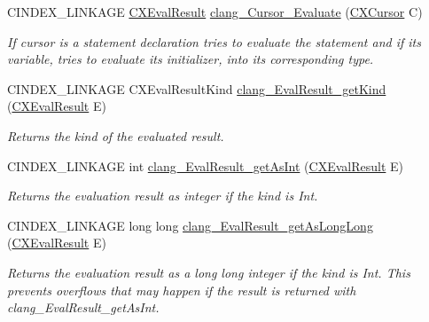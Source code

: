\begin{DoxyCompactItemize}
C\+I\+N\+D\+E\+X\+\_\+\+L\+I\+N\+K\+A\+GE \hyperlink{group__CINDEX__MISC_gaa9270afc68877e1f3b20ce5b343191bc}{C\+X\+Eval\+Result} \hyperlink{group__CINDEX__MISC_ga6be809ca82538f4a610d9a5b18a10ccb}{clang\+\_\+\+Cursor\+\_\+\+Evaluate} (\hyperlink{structCXCursor}{C\+X\+Cursor} C)
\begin{DoxyCompactList}\small\item\em If cursor is a statement declaration tries to evaluate the statement and if its variable, tries to evaluate its initializer, into its corresponding type. \end{DoxyCompactList}\item 
\mbox{\label{group__CINDEX__MISC_gaea912a0620a9c16c1e46fdedf4825955}} 
C\+I\+N\+D\+E\+X\+\_\+\+L\+I\+N\+K\+A\+GE C\+X\+Eval\+Result\+Kind \hyperlink{group__CINDEX__MISC_gaea912a0620a9c16c1e46fdedf4825955}{clang\+\_\+\+Eval\+Result\+\_\+get\+Kind} (\hyperlink{group__CINDEX__MISC_gaa9270afc68877e1f3b20ce5b343191bc}{C\+X\+Eval\+Result} E)
\begin{DoxyCompactList}\small\item\em Returns the kind of the evaluated result. \end{DoxyCompactList}\item 
\mbox{\label{group__CINDEX__MISC_ga8abe0404897d93813d98bd07a198caa1}} 
C\+I\+N\+D\+E\+X\+\_\+\+L\+I\+N\+K\+A\+GE int \hyperlink{group__CINDEX__MISC_ga8abe0404897d93813d98bd07a198caa1}{clang\+\_\+\+Eval\+Result\+\_\+get\+As\+Int} (\hyperlink{group__CINDEX__MISC_gaa9270afc68877e1f3b20ce5b343191bc}{C\+X\+Eval\+Result} E)
\begin{DoxyCompactList}\small\item\em Returns the evaluation result as integer if the kind is Int. \end{DoxyCompactList}\item 
\mbox{\label{group__CINDEX__MISC_ga488b6b6a445be15e80ffe4816b2086c8}} 
C\+I\+N\+D\+E\+X\+\_\+\+L\+I\+N\+K\+A\+GE long long \hyperlink{group__CINDEX__MISC_ga488b6b6a445be15e80ffe4816b2086c8}{clang\+\_\+\+Eval\+Result\+\_\+get\+As\+Long\+Long} (\hyperlink{group__CINDEX__MISC_gaa9270afc68877e1f3b20ce5b343191bc}{C\+X\+Eval\+Result} E)
\begin{DoxyCompactList}\small\item\em Returns the evaluation result as a long long integer if the kind is Int. This prevents overflows that may happen if the result is returned with clang\+\_\+\+Eval\+Result\+\_\+get\+As\+Int. \end{DoxyCompactList}\item 

\end{DoxyCompactItemize}

